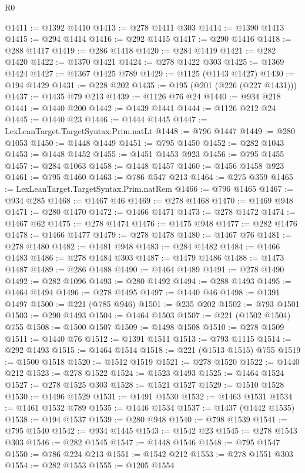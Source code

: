 \begin{lexlean}{R0}
\begin{coremodule}
@1411 := @1392 @1410
@1413 := @278 @1411 @303
@1414 := @1390 @1413
@1415 := @294 @1414
@1416 := @292 @1415
@1417 := @290 @1416
@1418 := @288 @1417
@1419 := @286 @1418
@1420 := @284 @1419
@1421 := @282 @1420
@1422 := @1370 @1421
@1424 := @278 @1422 @303
@1425 := @1369 @1424
@1427 := @1367 @1425 @789
@1429 := @1125 (@1143 @1427)
@1430 := @194 @1429
@1431 := @228 @202
@1435 := @195 (@201 (@226 (@227 @1431)))
@1437 := @1435 @79 @213
@1439 := @1126 @76 @24
@1440 := @934 @218
@1441 := @1440 @200
@1442 := @1439 @1441
@1444 := @1126 @212 @24
@1445 := @1440 @23
@1446 := @1444 @1445
@1447 := LexLeanTarget.TargetSyntax.Prim.natLt
@1448 := @796 @1447
@1449 := @280 @1053
@1450 := @1448 @1449
@1451 := @795 @1450
@1452 := @282 @1043
@1453 := @1448 @1452
@1455 := @1451 @1453 @923
@1456 := @795 @1455
@1457 := @284 @1063
@1458 := @1448 @1457
@1460 := @1456 @1458 @923
@1461 := @795 @1460
@1463 := @786 @547 @213
@1464 := @275 @359
@1465 := LexLeanTarget.TargetSyntax.Prim.natRem
@1466 := @796 @1465
@1467 := @934 @285
@1468 := @1467 @46
@1469 := @278 @1468
@1470 := @1469 @948
@1471 := @280 @1470
@1472 := @1466 @1471
@1473 := @278 @1472
@1474 := @1467 @62
@1475 := @278 @1474
@1476 := @1475 @948
@1477 := @282 @1476
@1478 := @1466 @1477
@1479 := @278 @1478
@1480 := @1467 @76
@1481 := @278 @1480
@1482 := @1481 @948
@1483 := @284 @1482
@1484 := @1466 @1483
@1486 := @278 @1484 @303
@1487 := @1479 @1486
@1488 := @1473 @1487
@1489 := @286 @1488
@1490 := @1464 @1489
@1491 := @278 @1490
@1492 := @282 @1096
@1493 := @280 @1492
@1494 := @288 @1493
@1495 := @1464 @1494
@1496 := @278 @1495
@1497 := @1440 @46
@1498 := @1391 @1497
@1500 := @221 (@785 @946)
@1501 := @235 @202
@1502 := @793 @1501
@1503 := @290 @1493
@1504 := @1464 @1503
@1507 := @221 (@1502 @1504) @755
@1508 := @1500 @1507
@1509 := @1498 @1508
@1510 := @278 @1509
@1511 := @1440 @76
@1512 := @1391 @1511
@1513 := @793 @1115
@1514 := @292 @1493
@1515 := @1464 @1514
@1518 := @221 (@1513 @1515) @755
@1519 := @1500 @1518
@1520 := @1512 @1519
@1521 := @278 @1520
@1522 := @1440 @212
@1523 := @278 @1522
@1524 := @1523 @1493
@1525 := @1464 @1524
@1527 := @278 @1525 @303
@1528 := @1521 @1527
@1529 := @1510 @1528
@1530 := @1496 @1529
@1531 := @1491 @1530
@1532 := @1463 @1531
@1534 := @1461 @1532 @789
@1535 := @1446 @1534
@1537 := @1437 (@1442 @1535)
@1538 := @194 @1537
@1539 := @280 @948
@1540 := @798 @1539
@1541 := @795 @1540
@1542 := @934 @1445
@1543 := @1542 @23
@1545 := @278 @1543 @303
@1546 := @282 @1545
@1547 := @1448 @1546
@1548 := @795 @1547
@1550 := @786 @224 @213
@1551 := @1542 @212
@1553 := @278 @1551 @303
@1554 := @282 @1553
@1555 := @1205 @1554

\end{coremodule}
\end{lexlean}
